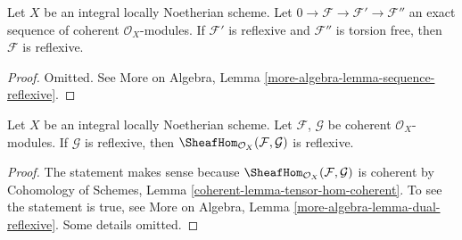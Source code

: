 \begin{lemma}
\label{lemma-sequence-reflexive}
Let $X$ be an integral locally Noetherian scheme.
Let $0 \to \mathcal{F} \to \mathcal{F}' \to \mathcal{F}''$
an exact sequence of coherent $\mathcal{O}_X$-modules.
If $\mathcal{F}'$ is reflexive and $\mathcal{F}''$ is torsion free,
then $\mathcal{F}$ is reflexive.
\end{lemma}

\begin{proof}
Omitted. See More on Algebra, Lemma \ref{more-algebra-lemma-sequence-reflexive}.
\end{proof}

\begin{lemma}
\label{lemma-dual-reflexive}
Let $X$ be an integral locally Noetherian scheme.
Let $\mathcal{F}$, $\mathcal{G}$ be
coherent $\mathcal{O}_X$-modules.
If $\mathcal{G}$ is reflexive,
then $\SheafHom_{\mathcal{O}_X}(\mathcal{F}, \mathcal{G})$ is reflexive.
\end{lemma}

\begin{proof}
The statement makes sense because
$\SheafHom_{\mathcal{O}_X}(\mathcal{F}, \mathcal{G})$
is coherent by Cohomology of Schemes, Lemma
\ref{coherent-lemma-tensor-hom-coherent}.
To see the statement is true, see
More on Algebra, Lemma \ref{more-algebra-lemma-dual-reflexive}.
Some details omitted.
\end{proof}

